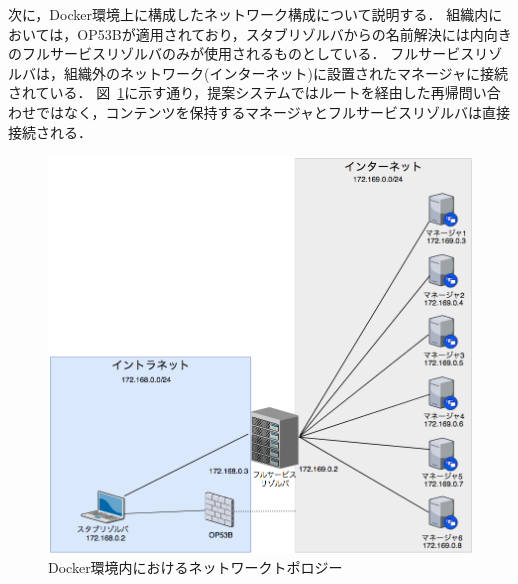 次に，Docker環境上に構成したネットワーク構成について説明する．
組織内においては，OP53Bが適用されており，スタブリゾルバからの名前解決には内向きのフルサービスリゾルバのみが使用されるものとしている．
フルサービスリゾルバは，組織外のネットワーク(インターネット)に設置されたマネージャに接続されている．
図~\ref{fig:exp-network-topology}に示す通り，提案システムではルートを経由した再帰問い合わせではなく，コンテンツを保持するマネージャとフルサービスリゾルバは直接接続される．

\begin{figure}[h]
 \centering
 \includegraphics[width=14.5cm]{figure/exp-network-topology.png}
 \caption[実験に用いたネットワークトポロジー]{Docker環境内におけるネットワークトポロジー}
 \label{fig:exp-network-topology}
\end{figure}

\newpage
